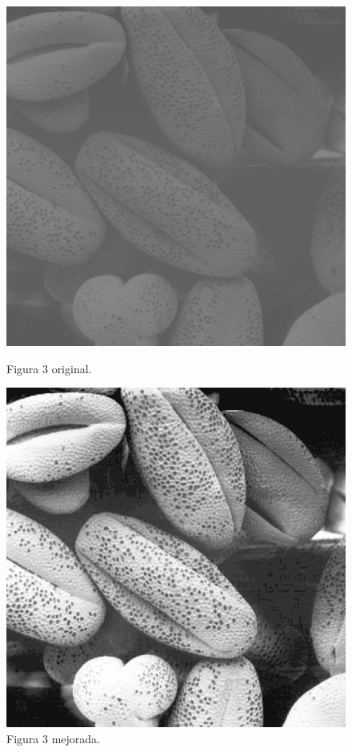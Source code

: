 \documentclass[11pt, letterpaper]{article}
\begin{document}
\begin{figure}[h]
	\centering
	\begin{minipage}{0.45\textwidth}
		\centering
		\includegraphics[width=\textwidth]{IMG/Fig3.15(a)3.jpg}
		\caption{Figura 3 original.}
		\label{fig:f17}
	\end{minipage}\hfill
	\begin{minipage}{0.45\textwidth}
		\centering
		\includegraphics[width=\textwidth]{RESULTADOS/img35.png}
		\caption{Figura 3 mejorada.}
		\label{fig:f18}
	\end{minipage}
	

\end{figure}
\end{document}

